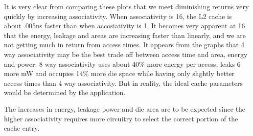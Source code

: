 \documentclass[a4paper, 11pt]{exam}
\begin{document}
\begin{enumerate}
\begin{enumerate}
\begin{figure}[H]
\begin{centering}
\end{centering}
\end{figure}
It is very clear from comparing these plots that we meet diminishing
returns very quickly by increasing associativity. When associativity
is 16, the L2 cache is about .005ns faster than when accosiativity is
1. It becomes very apparent at 16 that the energy, leakage and areas
are increasing faster than linearly, and we are not getting much in
return from access times. It appears from the graphs that 4 way
associativity may be the best trade off between access time and area,
energy and power: 8 way associativity uses about 40\% more energy per
access, leaks 6 more mW and occupies 14\% more die space while having
only slightly better access times than 4 way associativity. But in
reality, the ideal cache parameters would be determined by the
application.

The increases in energy, leakage power and die area are to be expected since
the higher associativity requires more circuitry to select the correct portion
of the cache entry.

\end{enumerate}
\end{enumerate}
\end{document}
